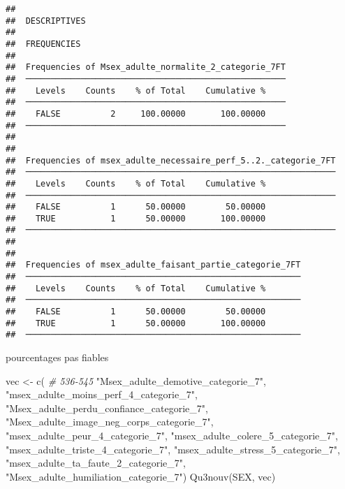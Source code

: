 \documentclass[
]{article}
\newenvironment{Shaded}{\begin{snugshade}}{\end{snugshade}}
\newcommand{\CommentTok}[1]{\textcolor[rgb]{0.56,0.35,0.01}{\textit{#1}}}
\newcommand{\FunctionTok}[1]{\textcolor[rgb]{0.00,0.00,0.00}{#1}}
\newcommand{\NormalTok}[1]{#1}
\newcommand{\OtherTok}[1]{\textcolor[rgb]{0.56,0.35,0.01}{#1}}
\newcommand{\StringTok}[1]{\textcolor[rgb]{0.31,0.60,0.02}{#1}}
\begin{document}
\begin{verbatim}
## 
##  DESCRIPTIVES
## 
##  FREQUENCIES
## 
##  Frequencies of Msex_adulte_normalite_2_categorie_7FT 
##  ──────────────────────────────────────────────────── 
##    Levels    Counts    % of Total    Cumulative %   
##  ──────────────────────────────────────────────────── 
##    FALSE          2     100.00000       100.00000   
##  ──────────────────────────────────────────────────── 
## 
## 
##  Frequencies of msex_adulte_necessaire_perf_5..2._categorie_7FT 
##  ────────────────────────────────────────────────────────────── 
##    Levels    Counts    % of Total    Cumulative %   
##  ────────────────────────────────────────────────────────────── 
##    FALSE          1      50.00000        50.00000   
##    TRUE           1      50.00000       100.00000   
##  ────────────────────────────────────────────────────────────── 
## 
## 
##  Frequencies of msex_adulte_faisant_partie_categorie_7FT 
##  ─────────────────────────────────────────────────────── 
##    Levels    Counts    % of Total    Cumulative %   
##  ─────────────────────────────────────────────────────── 
##    FALSE          1      50.00000        50.00000   
##    TRUE           1      50.00000       100.00000   
##  ───────────────────────────────────────────────────────
\end{verbatim}

pourcentages pas fiables

\begin{Shaded}
\begin{Highlighting}[]
\NormalTok{vec }\OtherTok{\textless{}{-}} \FunctionTok{c}\NormalTok{(  }\CommentTok{\# 536{-}545}
  \StringTok{"Msex\_adulte\_demotive\_categorie\_7"}\NormalTok{,}
  \StringTok{"msex\_adulte\_moins\_perf\_4\_categorie\_7"}\NormalTok{,}
  \StringTok{"Msex\_adulte\_perdu\_confiance\_categorie\_7"}\NormalTok{,}
  \StringTok{"Msex\_adulte\_image\_neg\_corps\_categorie\_7"}\NormalTok{,}
  \StringTok{"msex\_adulte\_peur\_4\_categorie\_7"}\NormalTok{,}
  \StringTok{"msex\_adulte\_colere\_5\_categorie\_7"}\NormalTok{,}
  \StringTok{"msex\_adulte\_triste\_4\_categorie\_7"}\NormalTok{,}
  \StringTok{"msex\_adulte\_stress\_5\_categorie\_7"}\NormalTok{,}
  \StringTok{"msex\_adulte\_ta\_faute\_2\_categorie\_7"}\NormalTok{,}
  \StringTok{"Msex\_adulte\_humiliation\_categorie\_7"}\NormalTok{)}
\FunctionTok{Qu3nouv}\NormalTok{(SEX, vec)}
\end{Highlighting}
\end{Shaded}
\end{document}
